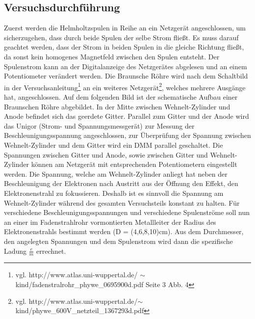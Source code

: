 \documentclass[12pt,a4paper]{article}
\begin{document}
\subsection{Versuchsdurchführung}
Zuerst werden die Helmholtzspulen in Reihe an ein Netzgerät angeschlossen, um sicherzugehen, dass durch beide Spulen der selbe Strom fließt. Es muss darauf geachtet werden, dass der Strom in beiden Spulen in die gleiche Richtung fließt, da sonst kein homogenes Magnetfeld zwischen den Spulen entsteht. Der Spulenstrom kann an der Digitalanzeige des Netzgerätes abgelesen und an einem Potentiometer verändert werden. Die Braunsche Röhre wird nach dem Schaltbild in der Versuchsanleitung\footnote{vgl. http://www.atlas.uni-wuppertal.de/
$\sim$kind/fadenstralrohr\_phywe\_0695900d.pdf Seite 3 Abb. 4} an ein weiteres Netzgerät\footnote{vgl. http://www.atlas.uni-wuppertal.de/$\sim   $kind/phywe\_600V\_netzteil\_1367293d.pdf}, welches mehrere Ausgänge hat, angeschlossen. Auf dem folgenden Bild ist der schematische Aufbau einer Braunschen Röhre abgebildet.
In der Mitte zwischen Wehnelt-Zylinder und Anode befindet sich das geerdete Gitter. Parallel zum Gitter und der Anode wird das Unigor (Strom- und Spannungsmessgerät) zur Messung der Beschleunigungsspannung angeschlossen, zur Überprüfung der Spannung zwischen Wehnelt-Zylinder und dem Gitter wird ein DMM parallel geschaltet. Die Spannungen zwischen Gitter und Anode, sowie zwischen Gitter und Wehnelt-Zylinder können am Netzgerät mit entsprechenden Potentiometern eingestellt werden. Die Spannung, welche am Wehnelt-Zylinder anliegt hat neben der Beschleunigung der Elektronen nach Austritt aus der Öffnung den Effekt, den Elektronenstrahl zu fokussieren. Deshalb ist es sinnvoll die Spannung am Wehnelt-Zylinder während des gesamten Versuchsteils konstant zu halten. Für verschiedene Beschleunigungsspannungen und verschiedene Spulenströme soll nun an einer im Fadenstrahlrohr vormontierten Metallleiter der Radius des Elektronenstrahls bestimmt werden (D = (4,6,8,10)cm). Aus dem Durchmesser, den angelegten Spannungen und dem Spulenstrom wird dann die spezifische Ladung $\frac{e}{m}$ errechnet.
\end{document}
